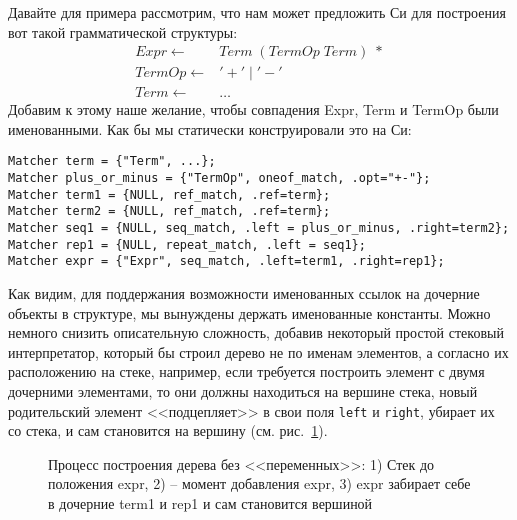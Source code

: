 \documentclass[10pt]{report}
\begin{document}
Давайте для примера рассмотрим, что нам может предложить Си для построения вот такой грамматической структуры:
\begin{equation}
\begin{array}{rl}
	Expr \gets  & Term \; (TermOp \; Term)\;* \\
	TermOp \gets & '+' \; | \; '-' \\
	Term \gets & \ldots 
\end{array} 
\end{equation}
Добавим к этому наше желание, чтобы совпадения Expr, Term и TermOp были именованными. Как бы мы статически конструировали это на Си:
\begin{lstlisting}
Matcher term = {"Term", ...};
Matcher plus_or_minus = {"TermOp", oneof_match, .opt="+-"};
Matcher term1 = {NULL, ref_match, .ref=term};
Matcher term2 = {NULL, ref_match, .ref=term};
Matcher seq1 = {NULL, seq_match, .left = plus_or_minus, .right=term2};
Matcher rep1 = {NULL, repeat_match, .left = seq1};
Matcher expr = {"Expr", seq_match, .left=term1, .right=rep1};
\end{lstlisting}
Как видим, для поддержания возможности именованных ссылок на дочерние объекты в структуре, мы вынуждены держать именованные константы.
Можно немного снизить описательную сложность, добавив некоторый простой стековый интерпретатор, который бы строил дерево не по именам элементов, а согласно их расположению на стеке, например, если требуется построить элемент с двумя дочерними элементами, то они должны находиться на вершине стека, новый родительский элемент <<подцепляет>> в свои поля {\tt left} и {\tt right}, убирает их со стека, и сам становится на вершину (см. рис.~\ref{fig:stack}).
\begin{figure}[b]
\begin{center}
\caption{Процесс построения дерева без <<переменных>>: 1) Стек до  положения expr, 2) -- момент добавления expr, 3) expr забирает себе в дочерние term1 и rep1 и сам становится вершиной  }
\label{fig:stack}
\end{center}
\end{figure}
\end{document}
